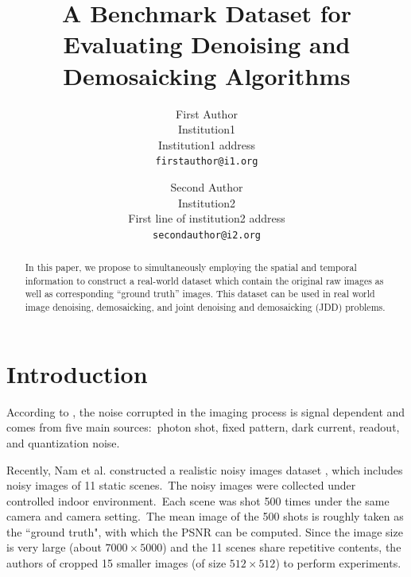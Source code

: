 \documentclass[10pt,twocolumn,letterpaper]{article}
\begin{document}
\title{A Benchmark Dataset for Evaluating Denoising and Demosaicking Algorithms}

\author{First Author\\
Institution1\\
Institution1 address\\
{\tt\small firstauthor@i1.org}
\and
Second Author\\
Institution2\\
First line of institution2 address\\
{\tt\small secondauthor@i2.org}
}

\maketitle


\begin{abstract}
In this paper, we propose to simultaneously employing the spatial and temporal information to construct a real-world dataset which contain the original raw images as well as corresponding ``ground truth'' images. This dataset can be used in real world image denoising, demosaicking, and joint denoising and demosaicking (JDD) problems.
\end{abstract}

\section{Introduction}

According to \cite{healey1994radiometric}, the noise corrupted in the imaging process is signal dependent and comes from five main sources:\ photon shot, fixed pattern, dark current, readout, and quantization noise.

Recently, Nam et al. constructed a realistic noisy images dataset \cite{crosschannel2016}, which includes noisy images of 11 static scenes.\ The noisy images were collected under controlled indoor environment.\ Each scene was shot 500 times under the same camera and camera setting.\ The mean image of the 500 shots is roughly taken as the ``ground truth", with which the PSNR can be computed. Since the image size is very large (about $7000\times5000$) and the 11 scenes share repetitive contents, the authors of \cite{crosschannel2016} cropped 15 smaller images (of size $512\times512$) to perform experiments.\
\end{document}
